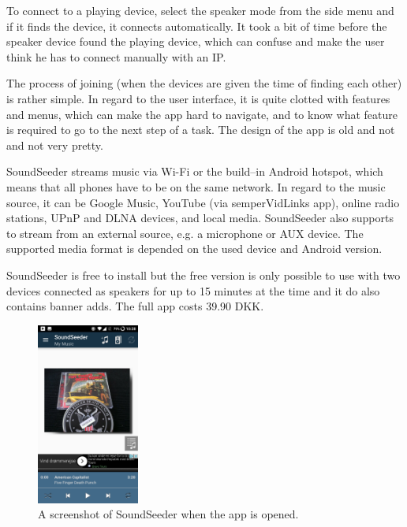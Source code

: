 To connect to a playing device, select the speaker mode from the side menu and if it finds the device, it connects automatically.
It took a bit of time before the speaker device found the playing device, which can confuse and make the user think he has to connect manually with an IP. 

The process of joining (when the devices are given the time of finding each other) is rather simple.
In regard to the user interface, it is quite clotted with features and menus, which can make the app hard to navigate,
and to know what feature is required to go to the next step of a task.
The design of the app is old and not and not very pretty.

SoundSeeder streams music via Wi-Fi or the build--in Android hotspot\cite{soundseether_faq}, 
which means that all phones have to be on the same network.
In regard to the music source, it can be Google Music, YouTube (via semperVidLinks app), online radio stations, UPnP and DLNA devices, and local media.
SoundSeeder also supports to stream from an external source, e.g. a microphone or AUX device. 
The supported media format is depended on the used device and Android version.\cite{soundseether_faq}

SoundSeeder is free to install but the free version is only possible to use with two devices connected as speakers for up to 15 minutes at the time and it do also contains banner adds.
The full app costs 39.90 DKK. 

\begin{figure}[h!]
    \centering
    \includegraphics[width=0.3\textwidth]{img/sota/soundseeder.png}
    \caption{A screenshot of SoundSeeder when the app is opened.}
    \label{fig:soundseeder_screenshot}
\end{figure}

